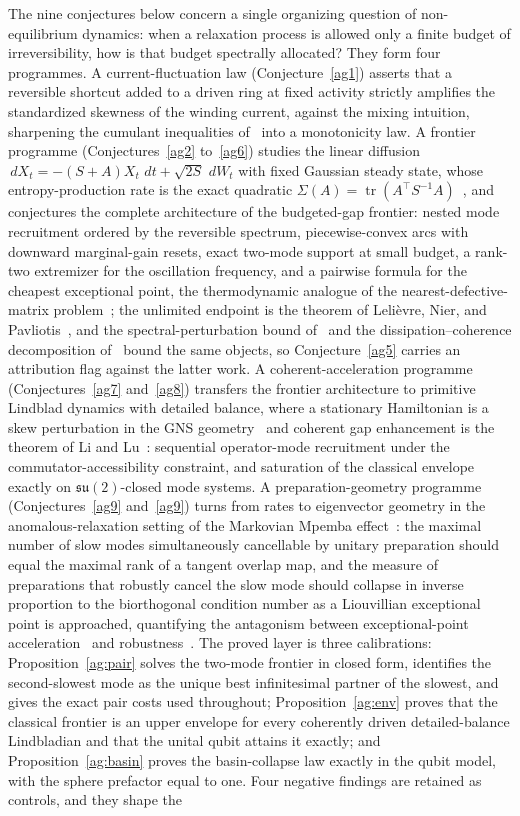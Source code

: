 \documentclass[11pt]{article}
\theoremstyle{definition}
\newcommand{\dd}{\,d}
\begin{document}
The nine conjectures below concern a single organizing question of non-equilibrium dynamics: when a relaxation process is allowed only a finite budget of irreversibility, how is that budget spectrally allocated?  They form four programmes.  A current-fluctuation law (Conjecture~\ref{ag1}) asserts that a reversible shortcut added to a driven ring at fixed activity strictly amplifies the standardized skewness of the winding current, against the mixing intuition, sharpening the cumulant inequalities of~\cite{WB22,Pta22} into a monotonicity law.  A frontier programme (Conjectures~\ref{ag2} to~\ref{ag6}) studies the linear diffusion $\dd X_t=-(S+A)X_t\,\dd t+\sqrt{2S}\,\dd W_t$ with fixed Gaussian steady state, whose entropy-production rate is the exact quadratic $\Sigma(A)=\operatorname{tr}(A^\top S^{-1}A)$~\cite{GL19}, and conjectures the complete architecture of the budgeted-gap frontier: nested mode recruitment ordered by the reversible spectrum, piecewise-convex arcs with downward marginal-gain resets, exact two-mode support at small budget, a rank-two extremizer for the oscillation frequency, and a pairwise formula for the cheapest exceptional point, the thermodynamic analogue of the nearest-defective-matrix problem~\cite{ABBO11}; the unlimited endpoint is the theorem of Leli\`evre, Nier, and Pavliotis~\cite{LNP13}, and the spectral-perturbation bound of~\cite{KOI24} and the dissipation--coherence decomposition of~\cite{NKI26} bound the same objects, so Conjecture~\ref{ag5} carries an attribution flag against the latter work.  A coherent-acceleration programme (Conjectures~\ref{ag7} and~\ref{ag8}) transfers the frontier architecture to primitive Lindblad dynamics with detailed balance, where a stationary Hamiltonian is a skew perturbation in the GNS geometry~\cite{Alicki76} and coherent gap enhancement is the theorem of Li and Lu~\cite{LiLu24}: sequential operator-mode recruitment under the commutator-accessibility constraint, and saturation of the classical envelope exactly on $\mathfrak{su}(2)$-closed mode systems.  A preparation-geometry programme (Conjectures~\ref{ag9} and~\ref{ag9}) turns from rates to eigenvector geometry in the anomalous-relaxation setting of the Markovian Mpemba effect~\cite{LR17,KRHV19}: the maximal number of slow modes simultaneously cancellable by unitary preparation should equal the maximal rank of a tangent overlap map, and the measure of preparations that robustly cancel the slow mode should collapse in inverse proportion to the biorthogonal condition number as a Liouvillian exceptional point is approached, quantifying the antagonism between exceptional-point acceleration~\cite{ZXW25,CTH24} and robustness~\cite{MP26}.  The proved layer is three calibrations: Proposition~\ref{ag:pair} solves the two-mode frontier in closed form, identifies the second-slowest mode as the unique best infinitesimal partner of the slowest, and gives the exact pair costs used throughout; Proposition~\ref{ag:env} proves that the classical frontier is an upper envelope for every coherently driven detailed-balance Lindbladian and that the unital qubit attains it exactly; and Proposition~\ref{ag:basin} proves the basin-collapse law exactly in the qubit model, with the sphere prefactor equal to one.  Four negative findings are retained as controls, and they shape the 
\end{document}
